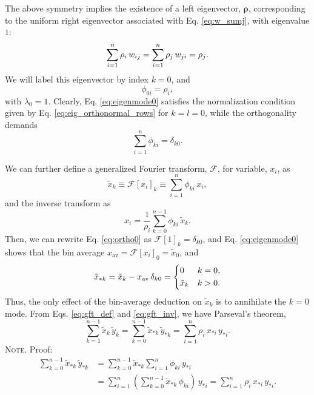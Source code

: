 \documentclass[reprint, superscriptaddress, floatfix]{revtex4-1}
\newcommand{\note}[1]{{\color{DarkGreen}\footnotesize \textsc{Note.} #1}}
\newcommand{\bav}[1]{#1_\mathrm{av}}
\begin{document}
The above symmetry implies the existence of
a left eigenvector, $\pmb \rho$,
corresponding to the uniform right eigenvector
associated with Eq. \eqref{eq:w_sumj},
with eigenvalue $1$:
%
\begin{equation}
  \sum_{i = 1}^n \rho_i \, w_{ij}
  =
  \sum_{i = 1}^n \rho_j \, w_{ji}
  =
  \rho_j
  .
  \notag
\end{equation}
%
We will label this eigenvector by index $k = 0$,
and
%
\begin{equation}
  \phi_{0i} = \rho_i,
\label{eq:eigenmode0}
\end{equation}
%
with $\lambda_0 = 1$.
%
Clearly, Eq. \eqref{eq:eigenmode0}
satisfies the normalization condition
given by Eq. \eqref{eq:eig_orthonormal_rows}
for $k = l = 0$,
while the orthogonality demands
%
\begin{equation}
  \sum_{ i = 1 }^n \phi_{ki}
  =
  \delta_{k0}
  .
\label{eq:ortho0}
\end{equation}

We can further define
a generalized Fourier transform, $\mathcal{F}$,
for variable, $x_i$, as
%
\begin{equation}
  {\tilde x}_k
  \equiv \mathcal{F}[x_i]_k
  \equiv \sum_{i = 1}^n \phi_{ki} \, x_i
  ,
  \label{eq:gft_def}
\end{equation}
%
and the inverse transform as
%
\begin{equation}
  x_i = \frac{1}{\rho_i} \sum_{k = 0}^{n-1} \phi_{ki} \, \tilde{x}_k
  .
  \label{eq:gft_inv}
\end{equation}
%
Then,
we can rewrite Eq. \eqref{eq:ortho0} as
$\mathcal F[1]_k = \delta_{k0}$,
%
and Eq. \eqref{eq:eigenmode0} shows that
the bin average
$\bav{x}= \mathcal F[x_i]_0 = \tilde x_0$,
%
and
\begin{equation}
  \tilde x_{*k}
  = \tilde x_k - \bav{x} \, \delta_{k0}
  =
  \begin{dcases}
    0           & k = 0
    ,
    \\
    \tilde x_k  & k > 0
    .
  \end{dcases}
  \label{eq:xtstar}
\end{equation}
%
Thus, the only effect
of the bin-average deduction on $\tilde x_k$ is to
annihilate the $k=0$ mode.
%
From Eqs. \eqref{eq:gft_def} and \eqref{eq:gft_inv},
we have Parseval's theorem,
\begin{equation}
  \sum_{k=1}^{n-1} \tilde x_k \, \tilde y_k
  =
  \sum_{k=0}^{n-1} \tilde x_{*k} \, \tilde y_{*k}
  =
  \sum_{i=1}^n \rho_i \, x_{*i} \, y_{*i}
  .
  \label{eq:parseval}
\end{equation}
\note{Proof:
\begin{align*}
  \sum_{k=0}^{n-1} \tilde x_{*k} \, \tilde y_{*k}
  &=
  \sum_{k=0}^{n-1} \tilde x_{*k} \sum_{i=1}^n \phi_{ki} \, y_{*i}
  \\
  &=
  \sum_{i=1}^n \left( \sum_{k=0}^{n-1} \tilde x_{*k} \, \phi_{ki} \right) \, y_{*i}
  =
  \sum_{i=1}^n \rho_i \, x_{*i} \, y_{*i}.
\end{align*}
}
\end{document}
